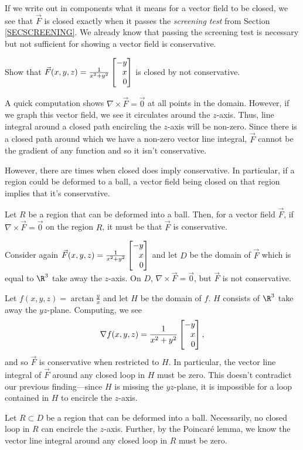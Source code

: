 If we write out in components what it means for a vector field to be closed,
we see that $\vec F$ is closed exactly when it passes the \emph{screening test}
from Section \ref{SECSCREENING}.  We already know that passing the screening test
is necessary but not sufficient for showing a vector field is conservative.

\begin{example}
	Show that $\vec F(x,y,z) = \frac{1}{x^2+y^2}\mat{-y\\x\\0}$ is closed by not conservative.

	A quick computation shows $\nabla \times \vec F = \vec 0$ at all points in the domain.  However,
	if we graph this vector field, we see it circulates around the $z$-axis.  Thus, line integral
	around a closed path encircling the $z$-axis will be non-zero.  Since there is a closed path
	around which we have a non-zero vector line integral, $\vec F$ cannot be the gradient of any function
	and so it isn't conservative.
\end{example}

However, there are times when closed does imply conservative.  In particular,
if a region could be deformed to a ball, a vector field
being closed on that region implies that it's conservative.

\begin{theorem}
	Let $R$ be a region that can be deformed into
	a ball.  Then, for a vector field $\vec F$,
	if $\nabla\times \vec F=\vec 0$ on the region $R$,
	it must be that $\vec F$ is conservative.
\end{theorem}

\begin{example}
	Consider again $\vec F(x,y,z) = \frac{1}{x^2+y^2}\mat{-y\\x\\0}$ and let $D$
	be the domain of $\vec F$ which is equal to $\R^3$ take away the $z$-axis.  On $D$, 
	$\nabla \times \vec F=\vec 0$, but $\vec F$ is not conservative.

	Let $f(x,y,z) = \arctan \frac{y}{x}$ and let $H$ be the domain of $f$.  $H$ consists of
	$\R^3$ take away the $yz$-plane.  Computing, we see
	\[
		\nabla f(x,y,z) = \frac{1}{x^2+y^2}\mat{-y\\x\\0},
	\]
	and so $\vec F$ is conservative when restricted to $H$.  In particular, the vector line
	integral of $\vec F$ around any closed loop in $H$ must be zero.  This doesn't contradict
	our previous finding---since $H$ is missing the $yz$-plane, it is impossible for a loop
	contained in $H$ to encircle the $z$-axis.

	Let $R\subset D$ be a region that can be deformed into a ball.  Necessarily, no closed loop in
	$R$ can encircle the $z$-axis.  Further, by the Poincar\'e lemma, we know the vector line
	integral around any closed loop in $R$ must be zero.
\end{example}

